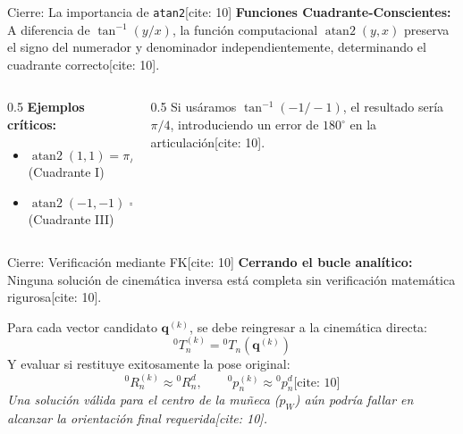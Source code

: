 \documentclass[aspectratio=169, xcolor={table,xcdraw}]{beamer}
\begin{document}
\begin{frame}{Cierre: La importancia de \texttt{atan2}[cite: 10]}
    \textbf{Funciones Cuadrante-Conscientes:} \\
    A diferencia de $\tan^{-1}(y/x)$, la función computacional $\operatorname{atan2}(y, x)$ preserva el signo del numerador y denominador independientemente, determinando el cuadrante correcto[cite: 10].
    \vspace{0.4cm}
    
    \begin{columns}
        \begin{column}{0.5\textwidth}
            \textbf{Ejemplos críticos:}
            \begin{itemize}
                \item $\operatorname{atan2}(1, 1) = \pi/4$ (Cuadrante I)
                \item $\operatorname{atan2}(-1, -1) = -3\pi/4$ (Cuadrante III)
            \end{itemize}
        \end{column}
        \begin{column}{0.5\textwidth}
            Si usáramos $\tan^{-1}(-1/-1)$, el resultado sería $\pi/4$, introduciendo un error de $180^\circ$ en la articulación[cite: 10].
        \end{column}
    \end{columns}
\end{frame}

\begin{frame}{Cierre: Verificación mediante FK[cite: 10]}
    \textbf{Cerrando el bucle analítico:} \\
    Ninguna solución de cinemática inversa está completa sin verificación matemática rigurosa[cite: 10].
    
    Para cada vector candidato $\mathbf{q}^{(k)}$, se debe reingresar a la cinemática directa:
    \begin{equation*}
        {}^0T_n^{(k)} = {}^0T_n(\mathbf{q}^{(k)})
    \end{equation*}
    Y evaluar si restituye exitosamente la pose original:
    \begin{equation*}
        {}^0R_n^{(k)} \approx {}^0R_n^d, \qquad {}^0p_n^{(k)} \approx {}^0p_n^d \text{[cite: 10]}
    \end{equation*}
    \textit{Una solución válida para el centro de la muñeca ($p_W$) aún podría fallar en alcanzar la orientación final requerida[cite: 10].}
\end{frame}
\end{document}

